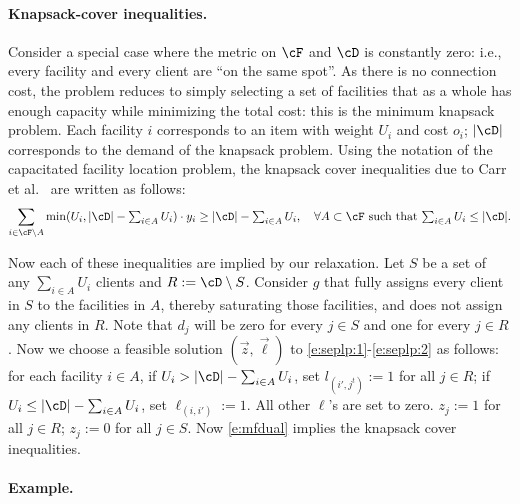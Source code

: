 \paragraph{Knapsack-cover inequalities.}
Consider a special case where the metric on $\cF$ and $\cD$ is constantly zero: i.e., every facility
and every client are ``on the same spot''. As there is no connection cost, the problem reduces to
simply selecting a set of facilities that as a whole has enough capacity while minimizing the total
cost: this is the minimum knapsack problem. Each facility $i$ corresponds to an item with weight $U_i$ and cost $o_i$; $|\cD|$
corresponds to the demand of the knapsack problem. Using the notation of the capacitated facility
location problem, the knapsack cover inequalities due to Carr et al.~\cite{CFLP2000} are written as follows:\begin{equation*} \sum_{i\in\cF\setminus A} \min
  (U_i,|\cD|-{\textstyle\sum_{i\in A}U_i})\cdot y_i\geq |\cD|-{\textstyle\sum_{i\in A}U_i},\quad
  \forall A\subset\cF\textrm{ such that }{\textstyle\sum_{i\in A}U_i}\leq |\cD| .\end{equation*}

Now each of these inequalities are implied by our relaxation. Let $S$ be a set of any
${\textstyle\sum_{i\in A}U_i}$ clients and $R:=\cD\setminus S$. Consider $g$ that fully assigns
every client in $S$ to the facilities in $A$, thereby saturating those facilities, and does not
assign any clients in $R$. Note that $d_j$ will be zero for every $j\in S$ and one for every $j\in
R$. Now we choose a feasible solution $(\vec{z},\vec{\ell})$ to \eqref{e:seplp:1}-\eqref{e:seplp:2} as follows: for
each facility $i\in A$, if $U_i> |\cD|-{\textstyle\sum_{i\in A}U_i}$, set $l_{(
  i',j^t)}:=1$ for all $j\in R$; if $U_i\leq |\cD|-{\textstyle\sum_{i\in A}U_i}$, set
$\ell_{( i,i')}:=1$. All other $\ell$'s are set to zero. $z_j:=1$ for all $j\in R$; $z_j:=0$
for all $j\in S$. Now \eqref{e:mfdual} implies the knapsack cover
inequalities.
 
\paragraph{Example.}

